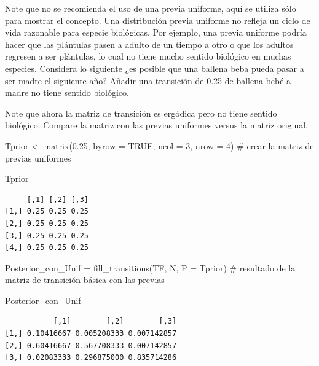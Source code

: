 \documentclass[
  12pt,
  letterpaper,
]{book}
\newenvironment{Shaded}{\begin{snugshade}}{\end{snugshade}}
\newcommand{\AttributeTok}[1]{\textcolor[rgb]{0.40,0.45,0.13}{#1}}
\newcommand{\CommentTok}[1]{\textcolor[rgb]{0.37,0.37,0.37}{#1}}
\newcommand{\ConstantTok}[1]{\textcolor[rgb]{0.56,0.35,0.01}{#1}}
\newcommand{\DecValTok}[1]{\textcolor[rgb]{0.68,0.00,0.00}{#1}}
\newcommand{\FloatTok}[1]{\textcolor[rgb]{0.68,0.00,0.00}{#1}}
\newcommand{\FunctionTok}[1]{\textcolor[rgb]{0.28,0.35,0.67}{#1}}
\newcommand{\NormalTok}[1]{\textcolor[rgb]{0.00,0.23,0.31}{#1}}
\newcommand{\OtherTok}[1]{\textcolor[rgb]{0.00,0.23,0.31}{#1}}
\begin{document}
Note que no se recomienda el uso de una previa uniforme, aquí se utiliza
sólo para mostrar el concepto. Una distribución previa uniforme no
refleja un ciclo de vida razonable para especie biológicas. Por ejemplo,
una previa uniforme podría hacer que las plántulas pasen a adulto de un
tiempo a otro o que los adultos regresen a ser plántulas, lo cual no
tiene mucho sentido biológico en muchas especies. Considera lo siguiente
¿es posible que una ballena beba pueda pasar a ser madre el siguiente
año? Añadir una transición de 0.25 de ballena bebé a madre no tiene
sentido biológico.

Note que ahora la matriz de transición es ergódica pero no tiene sentido
biológico. Compare la matriz con las previas uniformes versus la matriz
original.

\begin{Shaded}
\begin{Highlighting}[]
\NormalTok{Tprior }\OtherTok{\textless{}{-}} \FunctionTok{matrix}\NormalTok{(}\FloatTok{0.25}\NormalTok{, }\AttributeTok{byrow =} \ConstantTok{TRUE}\NormalTok{, }\AttributeTok{ncol =} \DecValTok{3}\NormalTok{, }\AttributeTok{nrow =} \DecValTok{4}\NormalTok{) }\CommentTok{\# crear la matriz de previas uniformes}

\NormalTok{Tprior}
\end{Highlighting}
\end{Shaded}

\begin{verbatim}
     [,1] [,2] [,3]
[1,] 0.25 0.25 0.25
[2,] 0.25 0.25 0.25
[3,] 0.25 0.25 0.25
[4,] 0.25 0.25 0.25
\end{verbatim}

\begin{Shaded}
\begin{Highlighting}[]
\NormalTok{Posterior\_con\_Unif }\OtherTok{=} \FunctionTok{fill\_transitions}\NormalTok{(TF, N, }\AttributeTok{P =}\NormalTok{ Tprior) }\CommentTok{\# resultado de la matriz de transición básica con las previas}

\NormalTok{Posterior\_con\_Unif}
\end{Highlighting}
\end{Shaded}

\begin{verbatim}
           [,1]        [,2]        [,3]
[1,] 0.10416667 0.005208333 0.007142857
[2,] 0.60416667 0.567708333 0.007142857
[3,] 0.02083333 0.296875000 0.835714286
\end{verbatim}

\begin{Shaded}
\end{Shaded}
\end{document}
